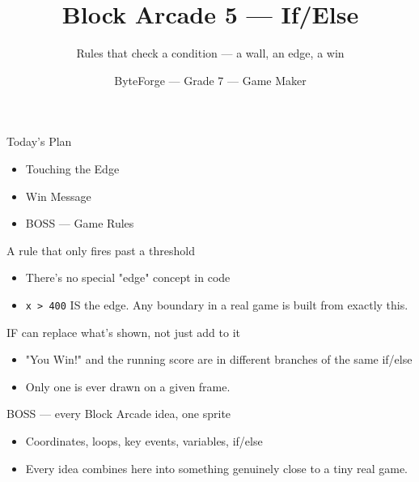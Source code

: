 \documentclass[aspectratio=169]{beamer}
\title{Block Arcade 5 — If/Else}
\subtitle{Rules that check a condition — a wall, an edge, a win}
\author{ByteForge --- Grade 7 --- Game Maker}
\date{}
\begin{document}
\begin{frame}
    \titlepage
\end{frame}

\begin{frame}{Today's Plan}
    \begin{itemize}
        \item Touching the Edge
        \item Win Message
        \item[$\bigstar$] BOSS --- Game Rules
    \end{itemize}
\end{frame}

\begin{frame}{A rule that only fires past a threshold}
    \large
    \begin{itemize}
        \item There's no special "edge" concept in code
        \item \texttt{x > 400} IS the edge. Any boundary in a real game is built from exactly this.
    \end{itemize}
\end{frame}


\begin{frame}{IF can replace what's shown, not just add to it}
    \large
    \begin{itemize}
        \item "You Win!" and the running score are in different branches of the same if/else
        \item Only one is ever drawn on a given frame.
    \end{itemize}

    \begin{center}
    \end{center}
\end{frame}


\begin{frame}{BOSS — every Block Arcade idea, one sprite}
    \large
    \begin{itemize}
        \item Coordinates, loops, key events, variables, if/else
        \item Every idea combines here into something genuinely close to a tiny real game.
    \end{itemize}
\end{frame}
\end{document}
